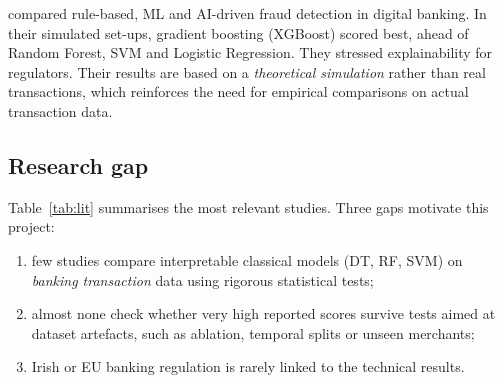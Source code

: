 \documentclass[12pt,a4paper]{article}
\begin{document}
\citet{naeem2026mlfraud} compared rule-based, ML and AI-driven fraud detection in digital banking. In their simulated set-ups, gradient boosting (XGBoost) scored best, ahead of Random Forest, SVM and Logistic Regression. They stressed explainability for regulators. Their results are based on a \emph{theoretical simulation} rather than real transactions, which reinforces the need for empirical comparisons on actual transaction data.

\subsection{Research gap}
Table~\ref{tab:lit} summarises the most relevant studies. Three gaps motivate this project:
\begin{enumerate}[nosep]
\item few studies compare interpretable classical models (DT, RF, SVM) on \emph{banking transaction} data using rigorous statistical tests;
\item almost none check whether very high reported scores survive tests aimed at dataset artefacts, such as ablation, temporal splits or unseen merchants;
\item Irish or EU banking regulation is rarely linked to the technical results.
\end{enumerate}
\end{document}
